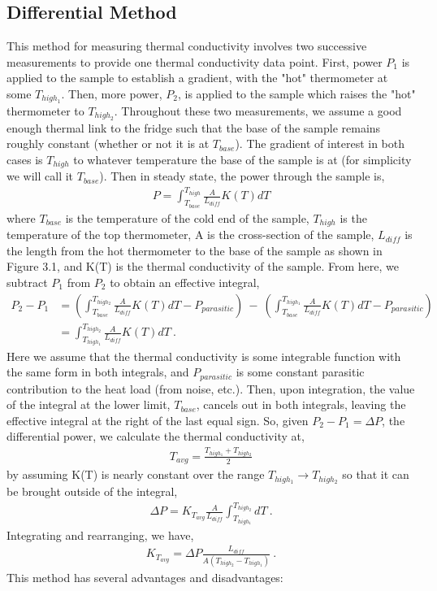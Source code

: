 \documentclass{report}
\begin{document}
\subsection{Differential Method}
This method for measuring thermal conductivity involves two successive measurements to provide one thermal conductivity data point. First, power $P_1$ is applied to the sample to establish a gradient, with the "hot" thermometer at some $T_{high_1}$. Then, more power, $P_2$, is applied to the sample which raises the "hot" thermometer to $T_{high_2}$. Throughout these two measurements, we assume a good enough thermal link to the fridge such that the base of the sample remains roughly constant (whether or not it is at $T_{base}$). The gradient of interest in both cases is $T_{high}$ to whatever temperature the base of the sample is at (for simplicity we will call it $T_{base}$). Then in steady state, the power through the sample is,
\begin{eqnarray}
P = \int_{T_{base}}^{T_{high}} \frac{A}{L_{diff}}K(T)dT
\end{eqnarray}
where $T_{base}$ is the temperature of the cold end of the sample, $T_{high}$ is the temperature of the top thermometer, A is the cross-section of the sample, $L_{diff}$ is the length from the hot thermometer to the base of the sample as shown in Figure 3.1, and K(T) is the thermal conductivity of the sample. From here, we subtract $P_1$ from $P_2$ to obtain an effective integral,
\begin{equation}
    \begin{aligned}
P_2 - P_1 & = \left(\int_{T_{base}}^{T_{high_2}} \frac{A}{L_{diff}} K(T)dT - P_{parasitic}\right) \ - \ \left(\int_{T_{base}}^{T_{high_1}} \frac{A}{L_{diff}} K(T)dT - P_{parasitic}\right) \\
& = \int_{T_{high_1}}^{T_{high_2}} \frac{A}{L_{diff}} K(T)dT \ .
    \end{aligned}
\end{equation}
Here we assume that the thermal conductivity is some integrable function with the same form in both integrals, and $P_{parasitic}$ is some constant parasitic contribution to the heat load (from noise, etc.). Then, upon integration, the value of the integral at the lower limit, $T_{base}$, cancels out in both integrals, leaving the effective integral at the right of the last equal sign. So, given $P_2 - P_1 = \Delta P$, the differential power, we calculate the thermal conductivity at,
\begin{eqnarray}
T_{avg} = \frac{T_{high_1} + T_{high_2}}{2}
\end{eqnarray}
by assuming K(T) is nearly constant over the range $T_{high_1} \rightarrow T_{high_2}$ so that it can be brought outside of the integral,
\begin{eqnarray}
\Delta P = K_{T_{avg}}\frac{A}{L_{diff}}\int_{T_{high_1}}^{T_{high_2}}dT \ .
\end{eqnarray}
Integrating and rearranging, we have,
\begin{eqnarray}
K_{T_{avg}} = \Delta P\frac{L_{diff}}{A(T_{high_2}-T_{high_1})} \ .
\end{eqnarray}
This method has several advantages and disadvantages:
\bigskip
\end{document}
